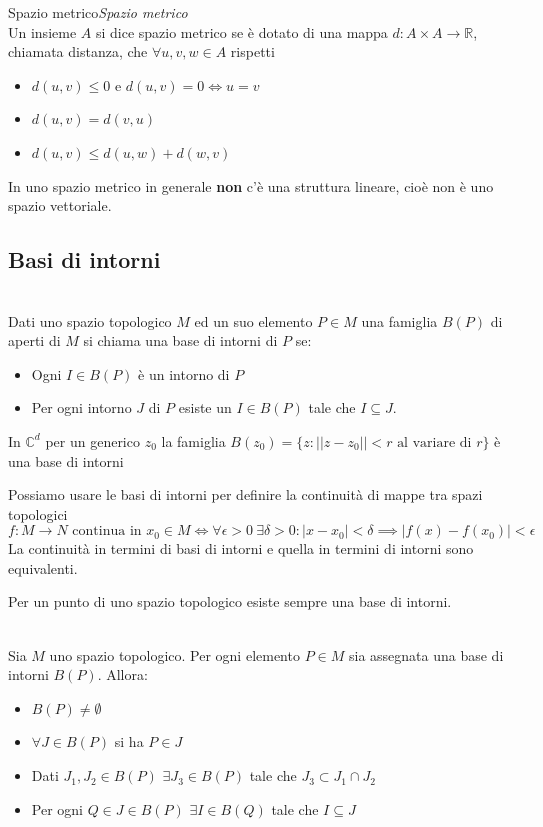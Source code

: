 \documentclass[11pt,a4paper,twoside]{book}
\newenvironment{proposizione}[1][\empty]{\begin{Proposizione}{
\ifx\empty#1\relax\else\mdseries\itshape#1\\\fi
}{}}{\end{Proposizione}}
\newenvironment{definizione}[1][\empty]{\begin{Definizione}{
\ifx\empty#1\relax\else\mdseries\itshape#1\\\fi
}{}}{\end{Definizione}}
\newenvironment{esempio}[1][Esempio]{ 
  \begin{center}\begin{tcolorbox}[
  title={#1:~},
  width=0.9\linewidth,
  flush right,
  enhanced jigsaw, 
  colback=white, 
  frame hidden, 
  sharpish corners, arc=3mm,
  borderline west = {1pt}{0pt}{gray},
  borderline south = {1pt}{0pt}{gray},
  coltitle=black, 
  fonttitle=\small\bfseries, 
  attach title to upper, 
  breakable,
  top=2.5pt, bottom=0.3pt]\small
  }{
 \normalsize \end{tcolorbox}\end{center}
}
\theoremstyle{esss}
\theoremstyle{dotless}
\numberwithin{equation}{section} %
\begin{document}
\begin{definizione}[Spazio metrico] Un insieme $A$ si dice spazio metrico se è dotato di una mappa $d:A\times A\rightarrow\mathbb{R}$, chiamata distanza, che $\forall u,v,w\in A$ rispetti\begin{itemize}[label=$\cdot$]
\item $d(u,v)\leq0$ e $d(u,v)=0\iff u=v$
\item $d(u,v)=d(v,u)$
\item $d(u,v)\leq d(u,w)+d(w,v)$
\end{itemize}\end{definizione}

In uno spazio metrico in generale \textbf{non} c'è una struttura lineare, cioè non è uno spazio vettoriale.

\subsection{Basi di intorni}

\begin{definizione}
Dati uno spazio topologico $M$ ed un suo elemento $P\in M$ una famiglia $B(P)$ di aperti di $M$ si chiama una base di intorni di $P$ se:\begin{itemize}[label=$\cdot$]
\item Ogni $I\in B(P)$ è un intorno di $P$
\item Per ogni intorno $J$ di $P$ esiste un $I\in B(P)$ tale che $I\subseteq J$.\end{itemize}
\end{definizione}
	
\begin{esempio}
In $\mathbb{C}^d$ per un generico $z_0$ la famiglia $B(z_0)=\{z: ||z-z_0||<r \text{ al variare di } r\}$ è una base di intorni 
\end{esempio}

Possiamo usare le basi di intorni per definire la continuità di mappe tra spazi topologici
\[f:M\rightarrow N\text{ continua in }x_0\in M \iff \forall\epsilon>0\>\exists\delta>0:|x-x_0|<\delta\implies |f(x)-f(x_0)|<\epsilon \]
La continuità in termini di basi di intorni e quella in termini di intorni sono equivalenti.

Per un punto di uno spazio topologico esiste sempre una base di intorni.

\begin{proposizione}\label{propBaseIntorni}
Sia $M$ uno spazio topologico. Per ogni elemento $P\in M$ sia assegnata una base di intorni $B(P)$. Allora:\begin{itemize}[label=$\cdot$]
\item $B(P)\neq\emptyset$
\item $\forall J\in B(P)$ si ha $P\in J$
\item Dati $J_1,J_2\in B(P)$ $\exists J_3\in B(P)$ tale che $J_3\subset J_1 \cap J_2$
\item Per ogni $Q\in J\in B(P)$ $\exists I\in B(Q)$ tale che $I\subseteq J$
\end{itemize}
\end{proposizione}
\end{document}
